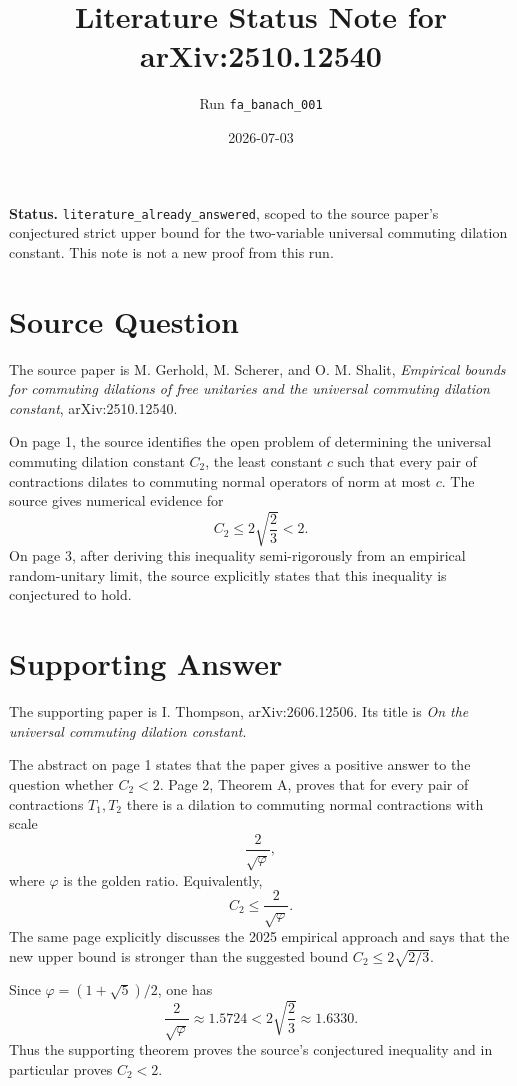 \documentclass[11pt]{article}
\title{Literature Status Note for arXiv:2510.12540}
\author{Run \texttt{fa\_banach\_001}}
\date{2026-07-03}
\begin{document}
\maketitle

\noindent\textbf{Status.}
\texttt{literature\_already\_answered}, scoped to the source paper's
conjectured strict upper bound for the two-variable universal commuting
dilation constant. This note is not a new proof from this run.

\section*{Source Question}

The source paper is M. Gerhold, M. Scherer, and O. M. Shalit,
\emph{Empirical bounds for commuting dilations of free unitaries and the
universal commuting dilation constant}, arXiv:2510.12540.

On page 1, the source identifies the open problem of determining the universal
commuting dilation constant \(C_2\), the least constant \(c\) such that every
pair of contractions dilates to commuting normal operators of norm at most
\(c\). The source gives numerical evidence for
\[
  C_2 \leq 2\sqrt{\frac{2}{3}} < 2 .
\]
On page 3, after deriving this inequality semi-rigorously from an empirical
random-unitary limit, the source explicitly states that this inequality is
conjectured to hold.

\section*{Supporting Answer}

The supporting paper is I. Thompson, arXiv:2606.12506. Its title is
\emph{On the universal commuting dilation constant}.

The abstract on page 1 states that the paper gives a positive answer to the
question whether \(C_2<2\). Page 2, Theorem A, proves that for every pair of
contractions \(T_1,T_2\) there is a dilation to commuting normal contractions
with scale
\[
  \frac{2}{\sqrt{\varphi}},
\]
where \(\varphi\) is the golden ratio. Equivalently,
\[
  C_2 \leq \frac{2}{\sqrt{\varphi}} .
\]
The same page explicitly discusses the 2025 empirical approach and says that
the new upper bound is stronger than the suggested bound
\(C_2 \leq 2\sqrt{2/3}\).

Since \(\varphi=(1+\sqrt5)/2\), one has
\[
  \frac{2}{\sqrt{\varphi}} \approx 1.5724
  < 2\sqrt{\frac{2}{3}} \approx 1.6330 .
\]
Thus the supporting theorem proves the source's conjectured inequality and in
particular proves \(C_2<2\).
\end{document}
